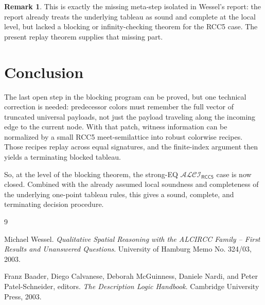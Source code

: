 \documentclass[11pt]{article}
\theoremstyle{definition}
\newtheorem{remark}[theorem]{Remark}
\newcommand{\ALCIRCCFive}{\mathcal{ALCI}_{\mathsf{RCC5}}}
\begin{document}
\begin{remark}
This is exactly the missing meta-step isolated in Wessel's report: the report already treats the underlying tableau as sound and complete at the local level, but lacked a blocking or infinity-checking theorem for the RCC5 case. The present replay theorem supplies that missing part.
\end{remark}

\section{Conclusion}

The last open step in the blocking program can be proved, but one technical correction is needed: predecessor colors must remember the full vector of truncated universal payloads, not just the payload traveling along the incoming edge to the current node. With that patch, witness information can be normalized by a small RCC5 meet-semilattice into robust colorwise recipes. Those recipes replay across equal signatures, and the finite-index argument then yields a terminating blocked tableau.

So, at the level of the blocking theorem, the strong-EQ $\ALCIRCCFive$ case is now closed. Combined with the already assumed local soundness and completeness of the underlying one-point tableau rules, this gives a sound, complete, and terminating decision procedure.

\begin{thebibliography}{9}

Michael Wessel.
\newblock \emph{Qualitative Spatial Reasoning with the ALCIRCC Family -- First Results and Unanswered Questions}.
\newblock University of Hamburg Memo No. 324/03, 2003.

Franz Baader, Diego Calvanese, Deborah McGuinness, Daniele Nardi, and Peter Patel-Schneider, editors.
\newblock \emph{The Description Logic Handbook}.
\newblock Cambridge University Press, 2003.

\end{thebibliography}
\end{document}
